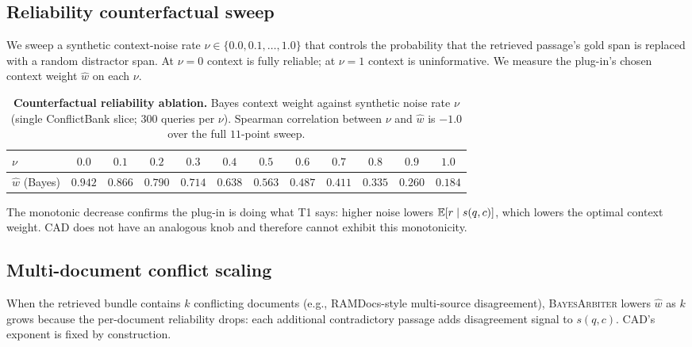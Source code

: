 \subsection{Reliability counterfactual sweep}
\label{app:reliability-noise-ablation}

We sweep a synthetic context-noise rate $\nu\in\{0.0, 0.1, \ldots, 1.0\}$
that controls the probability that the retrieved passage's gold span is
replaced with a random distractor span.  At $\nu=0$ context is fully
reliable; at $\nu=1$ context is uninformative.  We measure the
plug-in's chosen context weight $\hat w$ on each $\nu$.

\begin{table}[H]
\centering\small
\caption{\textbf{Counterfactual reliability ablation.} Bayes context
weight against synthetic noise rate $\nu$ (single ConflictBank slice;
$300$ queries per $\nu$).  Spearman correlation between $\nu$ and
$\hat w$ is $-1.0$ over the full $11$-point sweep.}
\label{tab:reliability-noise-ablation}
\setlength{\tabcolsep}{4pt}
\begin{tabular}{lccccccccccc}
\toprule
$\nu$         & $0.0$ & $0.1$ & $0.2$ & $0.3$ & $0.4$ & $0.5$ & $0.6$ & $0.7$ & $0.8$ & $0.9$ & $1.0$\\
\midrule
$\hat w$ (Bayes)  & $0.942$ & $0.866$ & $0.790$ & $0.714$ & $0.638$ & $0.563$ & $0.487$ & $0.411$ & $0.335$ & $0.260$ & $0.184$\\
\bottomrule
\end{tabular}
\end{table}

The monotonic decrease confirms the plug-in is doing what T1 says:
higher noise lowers $\mathbb{E}[r\mid s(q,c)]$, which lowers the optimal
context weight.  CAD does not have an analogous knob and therefore
cannot exhibit this monotonicity.

\subsection{Multi-document conflict scaling}
\label{app:multidoc-scaling}

When the retrieved bundle contains $k$ conflicting documents (e.g.,
RAMDocs-style multi-source disagreement), \textsc{BayesArbiter} lowers
$\hat w$ as $k$ grows because the per-document reliability drops:
each additional contradictory passage adds disagreement signal to
$s(q,c)$.  CAD's exponent is fixed by construction.

